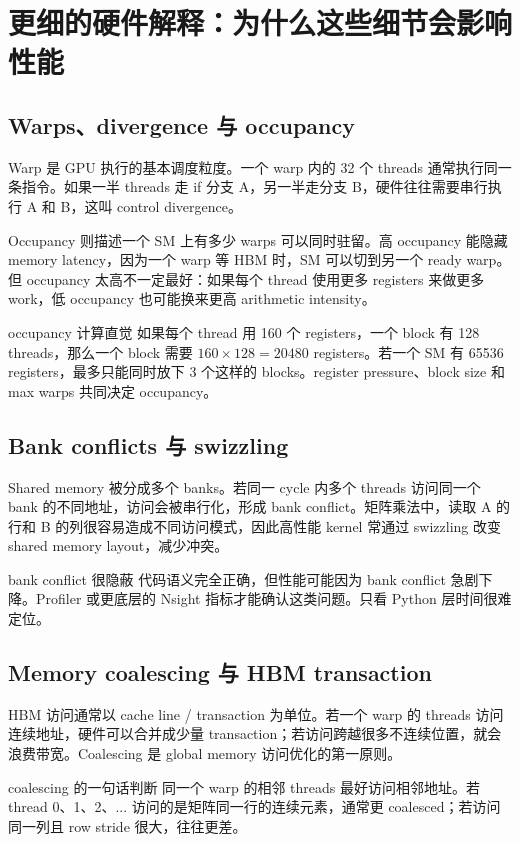 \section{更细的硬件解释：为什么这些细节会影响性能}

\subsection{Warps、divergence 与 occupancy}

Warp 是 GPU 执行的基本调度粒度。一个 warp 内的 32 个 threads 通常执行同一条指令。如果一半 threads 走 if 分支 A，另一半走分支 B，硬件往往需要串行执行 A 和 B，这叫 control divergence。

Occupancy 则描述一个 SM 上有多少 warps 可以同时驻留。高 occupancy 能隐藏 memory latency，因为一个 warp 等 HBM 时，SM 可以切到另一个 ready warp。但 occupancy 太高不一定最好：如果每个 thread 使用更多 registers 来做更多 work，低 occupancy 也可能换来更高 arithmetic intensity。

\begin{knowledgebox}{occupancy 计算直觉}
如果每个 thread 用 160 个 registers，一个 block 有 128 threads，那么一个 block 需要 \(160\times128=20480\) registers。若一个 SM 有 65536 registers，最多只能同时放下 3 个这样的 blocks。register pressure、block size 和 max warps 共同决定 occupancy。
\end{knowledgebox}

\subsection{Bank conflicts 与 swizzling}

Shared memory 被分成多个 banks。若同一 cycle 内多个 threads 访问同一个 bank 的不同地址，访问会被串行化，形成 bank conflict。矩阵乘法中，读取 A 的行和 B 的列很容易造成不同访问模式，因此高性能 kernel 常通过 swizzling 改变 shared memory layout，减少冲突。

\begin{warningbox}{bank conflict 很隐蔽}
代码语义完全正确，但性能可能因为 bank conflict 急剧下降。Profiler 或更底层的 Nsight 指标才能确认这类问题。只看 Python 层时间很难定位。
\end{warningbox}

\subsection{Memory coalescing 与 HBM transaction}

HBM 访问通常以 cache line / transaction 为单位。若一个 warp 的 threads 访问连续地址，硬件可以合并成少量 transaction；若访问跨越很多不连续位置，就会浪费带宽。Coalescing 是 global memory 访问优化的第一原则。

\begin{importantbox}{coalescing 的一句话判断}
同一个 warp 的相邻 threads 最好访问相邻地址。若 thread 0、1、2、... 访问的是矩阵同一行的连续元素，通常更 coalesced；若访问同一列且 row stride 很大，往往更差。
\end{importantbox}


